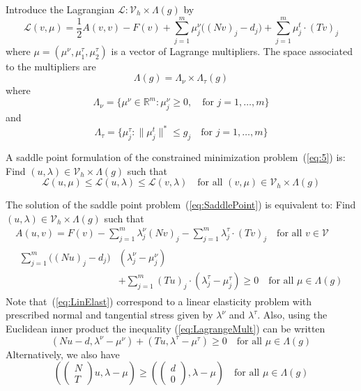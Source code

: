 \documentclass[12pt,a4paper]{article}
\numberwithin{equation}{section}
\numberwithin{table}{section}
\numberwithin{figure}{section}
\newcommand{\R}{\ensuremath{\mathbb{R}}}
\newcommand{\half}{\ensuremath{\frac{1}{2}}}
\newcommand{\V}{\ensuremath{\mathcal{V}}}
\newcommand{\Vh}{{\mathcal V}_h}
\renewcommand{\L}{{\mathcal L}}
\newcommand{\sumjm}{\sum_{j=1}^m}
\providecommand{\norm}[1]{\lVert #1 \rVert}
\newcommand{\qforall}{\quad\text{for all }}
\begin{document}
Introduce the Lagrangian $\L \colon \Vh\times \Lambda(g)$ by
\begin{equation}
  \label{eq:15}
  \L(v,\mu) = \half A(v,v) - F(v) + \sumjm \mu^\nu_j \bigl((Nv)_j-d_j\bigr)
  + \sumjm \mu^t_j \cdot (Tv)_j
\end{equation}
where $\mu=(\mu^\nu, \mu^\tau_1, \mu^\tau_2)$ is a vector of Lagrange multipliers.  The space
associated to the multipliers are
\begin{equation}
  \label{eq:16}
  \Lambda(g) = \Lambda_\nu \times \Lambda_\tau(g)
\end{equation}
where
\begin{equation}
  \label{eq:17}
  \Lambda_\nu = \{\mu^\nu \in\R^m \colon \mu^\nu_j \ge 0,\quad\text{for }j=1,\dotsc,m \}
\end{equation}
and
\begin{equation}
  \label{eq:18}
  \Lambda_\tau = \{\mu^\tau_j \colon \norm{\mu^t_j}^* \le g_j \quad\text{for }j=1,\dotsc,m\}
\end{equation}

A saddle point formulation of the constrained minimization problem~(\ref{eq:5}) is: Find
$(u,\lambda)\in \Vh\times\Lambda(g)$ such that
\begin{equation}
  \label{eq:SaddlePoint}
  \L(u, \mu) \le \L(u,\lambda) \le \L(v,\lambda) \qforall (v,\mu) \in \Vh\times \Lambda(g)
\end{equation}

The solution of the saddle point problem~(\ref{eq:SaddlePoint}) is equivalent to:  Find
$(u,\lambda)\in \Vh\times\Lambda(g)$ such that
\begin{gather}
  \label{eq:LinElast}
  A(u,v) = F(v) - \sumjm \lambda^\nu_j (Nv)_j - \sumjm \lambda^\tau_j \cdot (Tv)_j
  \qforall v\in\V \\
  \begin{split}
  \sumjm \bigl((Nu)_j - d_j\bigr)&(\lambda^\nu_j - \mu^\nu_j) \\ 
  &+ \sumjm (Tu)_j \cdot (\lambda^\tau_j - \mu^\tau_j) \ge 0 \qforall \mu \in \Lambda(g)    
  \end{split}
  \label{eq:LagrangeMult}
\end{gather}
Note that~(\ref{eq:LinElast}) correspond to a linear elasticity problem with prescribed
normal and tangential stress given by $\lambda^\nu$ and $\lambda^\tau$.  Also, using the
Euclidean inner product the inequality (\ref{eq:LagrangeMult}) can be written
\begin{equation}
  \label{eq:LagrangeMultInner}
  (N u - d, \lambda^\nu-\mu^\nu) + (T u, \lambda^\tau-\mu^\tau) \ge 0
  \qforall \mu \in \Lambda(g)
\end{equation}
Alternatively, we also have
\begin{equation}
  \label{eq:20}
  (
  \begin{pmatrix}
    N \\ T
  \end{pmatrix}
  u, \lambda - \mu) \ge (
  \begin{pmatrix}
    d \\ 0
  \end{pmatrix}, \lambda - \mu) \qforall \mu\in\Lambda(g)
\end{equation}
\end{document}

